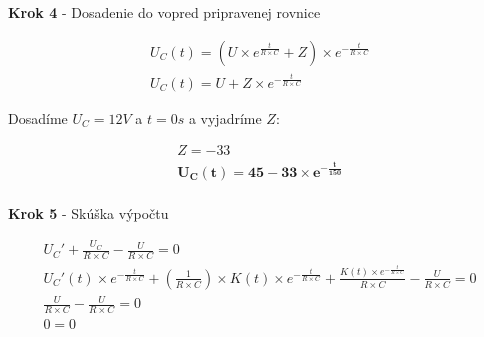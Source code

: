 \begin{center}
\textbf{Krok 4} - Dosadenie do vopred pripravenej rovnice
\end{center}

\begin{gather*}
U_{C}(t) =(U \times e^{\frac{t}{R \times C}} + Z) \times e^{-\frac{t}{R \times C}}\\
U_{C}(t) =U + Z \times e^{-\frac{t}{R \times C}}
\end{gather*}

\begin{center}
Dosadíme $U_{C} = 12V$ a $t = 0s$ a vyjadríme $Z$:
\end{center}

\begin{gather*}
Z = -33\\
\boldsymbol{U_{C}(t) = 45 - 33 \times e^{-\frac{t}{150}}}\\
\end{gather*}

\begin{center}
\textbf{Krok 5} - Skúška výpočtu
\end{center}

\begin{gather*}
U_{C}' + \frac{U_{C}}{R \times C} -  \frac{U}{R \times C} = 0\\
U_{C}'(t) \times e^{-\frac{t}{R \times C}} + ( \frac{1}{R \times C}) \times K(t) \times e^{-\frac{t}{R \times C}} + \frac{K(t) \times e^{-\frac{t}{R \times C}}}{R \times C} - \frac{U}{R \times C} = 0\\
\frac{U}{R \times C} - \frac{U}{R \times C} = 0\\
0 = 0
\end{gather*}
